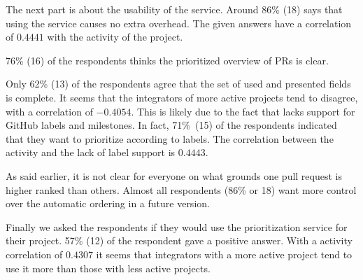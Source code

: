 \documentclass[conference]{IEEEtran}
\begin{document}
The next part is about the usability of the service.
Around 86\% (18) says that using the service causes no extra overhead.
The given answers have a correlation of $0.4441$ with the activity of the project. 

76\% (16) of the respondents thinks the prioritized overview of PRs is clear.

Only 62\% (13) of the respondents agree that the set of used and presented fields is complete.
It seems that the integrators of more active projects tend to disagree, with a correlation of $-0.4054$.
This is likely due to the fact that \prioritizer lacks support for GitHub labels and milestones. In fact, 71\%~(15) 
of the respondents indicated that they want to prioritize according to labels.
The correlation between the activity and the lack of label support is $0.4443$. 

As said earlier, it is not clear for everyone on what grounds one pull request is higher ranked than others.
Almost all respondents (86\% or 18) want more control over the automatic ordering in a future version.

Finally we asked the respondents if they would use the prioritization service for their project.
57\% (12) of the respondent gave a positive answer.
With a activity correlation of $0.4307$ it seems that integrators with a more active project tend to use it more than those with less active projects.
\end{document}
